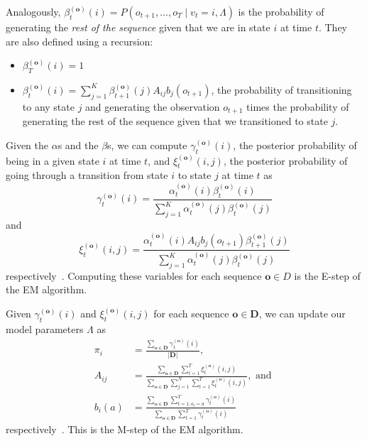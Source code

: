 Analogously, $\beta^{(\mathbf{o})}_t(i) = P(o_{t+1}, \ldots, o_{T} \mid v_t
= i, \Lambda)$ is the probability of generating the \emph{rest of the
sequence} given that we are in state $i$ at time $t$. They are also defined
using a recursion:
\begin{itemize}
  \item $\beta^{(\mathbf{o})}_T(i) = 1$
  \item $\beta^{(\mathbf{o})}_t(i) = \sum_{j=1}^K
    \beta^{(\mathbf{o})}_{t+1}(j) A_{ij} b_j(o_{t+1})$, the probability of
    transitioning to any state $j$ and generating the observation $o_{t+1}$
    times the probability of generating the rest of the sequence given that
    we transitioned to state $j$.
\end{itemize}

Given the $\alpha$s and the $\beta$s, we can compute
$\gamma^{(\mathbf{o})}_t(i)$, the posterior probability of being in a given
state $i$ at time $t$, and $\xi^{(\mathbf{o})}_t(i,j)$, the posterior
probability of going through a transition from state $i$ to state $j$ at
time $t$ as
\begin{equation}
  \gamma^{(\mathbf{o})}_t(i) =
  \frac{\alpha^{(\mathbf{o})}_t(i)\beta^{(\mathbf{o})}_t(i)}{\sum_{j=1}^K
  \alpha^{(\mathbf{o})}_t(j)\beta^{(\mathbf{o})}_t(j)}
\end{equation}
and
\begin{equation}
  \xi^{(\mathbf{o})}_t(i,j) = \frac{\alpha^{(\mathbf{o})}_t(i) A_{ij}
  b_j(o_{t+1}) \beta^{(\mathbf{o})}_{t+1}(j)} {\sum_{j=1}^K
  \alpha^{(\mathbf{o})}_t(j)\beta^{(\mathbf{o})}_t(j)}
\end{equation}
respectively~\cite{Rabiner:1990:RSR}. Computing these variables for each
sequence $\mathbf{o} \in D$ is the E-step of the EM algorithm.

Given $\gamma^{(\mathbf{o})}_t(i)$ and $\xi^{(\mathbf{o})}_t(i,j)$ for each
sequence $\mathbf{o} \in \mathbf{D}$, we can update our model parameters $\Lambda$
as
\begin{align}
  \pi_i &= \frac{\sum_{\mathbf{o} \in \mathbf{D}}
  \gamma^{(\mathbf{o})}_1(i)}{|\mathbf{D}|},\\
  A_{ij} &= \frac{\sum_{\mathbf{o} \in \mathbf{D}} \sum_{t=1}^T
  \xi^{(\mathbf{o})}_t(i,j)} {\sum_{\mathbf{o} \in \mathbf{D}} \sum_{j=1}^N
  \sum_{t=1}^T \xi^{(\mathbf{o})}_t(i,j)},
  \text{ and }\\
  b_i(a) &= \frac{\sum_{\mathbf{o} \in \mathbf{D}} \sum_{t=1, o_t = a}^T
  \gamma^{(\mathbf{o})}_t(i)} {\sum_{\mathbf{o} \in \mathbf{D}}
  \sum_{t=1}^T \gamma^{(\mathbf{o})}_t(i)}
\end{align}
respectively~\cite{Rabiner:1990:RSR}. This is the M-step of the EM
algorithm.

